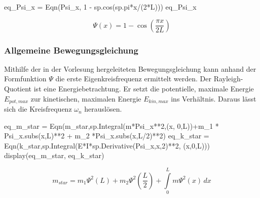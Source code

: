 \documentclass[
  letterpaper,
  DIV=11,
  numbers=noendperiod]{scrartcl}
\newenvironment{Shaded}{\begin{snugshade}}{\end{snugshade}}
\newcommand{\DecValTok}[1]{\textcolor[rgb]{0.68,0.00,0.00}{#1}}
\newcommand{\NormalTok}[1]{\textcolor[rgb]{0.00,0.23,0.31}{#1}}
\newcommand{\OperatorTok}[1]{\textcolor[rgb]{0.37,0.37,0.37}{#1}}
\begin{document}
\begin{Shaded}
\begin{Highlighting}[]
\NormalTok{eq\_Psi\_x }\OperatorTok{=}\NormalTok{ Eqn(Psi\_x, }\DecValTok{1} \OperatorTok{{-}}\NormalTok{ sp.cos(sp.pi}\OperatorTok{*}\NormalTok{x}\OperatorTok{/}\NormalTok{(}\DecValTok{2}\OperatorTok{*}\NormalTok{L)))}
\NormalTok{eq\_Psi\_x}
\end{Highlighting}
\end{Shaded}

\begin{equation}\Psi{\left(x \right)} = 1 - \cos{\left(\frac{\pi x}{2 L} \right)}\end{equation}

\hypertarget{allgemeine-bewegungsgleichung}{%
\subsubsection{Allgemeine
Bewegungsgleichung}\label{allgemeine-bewegungsgleichung}}

Mithilfe der in der Vorlesung hergeleiteten Bewegungsgleichung kann
anhand der Formfunktion \(\Psi\) die erste Eigenkreisfrequenz ermittelt
werden. Der Rayleigh-Quotient ist eine Energiebetrachtung. Er setzt die
potentielle, maximale Energie \(E_{pot,max}\) zur kinetischen, maximalen
Energie \(E_{kin,max}\) ins Verhältnis. Daraus lässt sich die
Kreisfrequenz \(\omega_n\) herauslösen.

\begin{Shaded}
\begin{Highlighting}[]
\NormalTok{eq\_m\_star }\OperatorTok{=}\NormalTok{ Eqn(m\_star,sp.Integral(m}\OperatorTok{*}\NormalTok{Psi\_x}\OperatorTok{**}\DecValTok{2}\NormalTok{,(x, }\DecValTok{0}\NormalTok{,L))}\OperatorTok{+}\NormalTok{m\_1 }\OperatorTok{*}\NormalTok{ Psi\_x.subs(x,L)}\OperatorTok{**}\DecValTok{2} \OperatorTok{+}\NormalTok{ m\_2 }\OperatorTok{*}\NormalTok{Psi\_x.subs(x,L}\OperatorTok{/}\DecValTok{2}\NormalTok{)}\OperatorTok{**}\DecValTok{2}\NormalTok{)}
\NormalTok{eq\_k\_star }\OperatorTok{=}\NormalTok{ Eqn(k\_star,sp.Integral(E}\OperatorTok{*}\NormalTok{I}\OperatorTok{*}\NormalTok{sp.Derivative(Psi\_x,x,}\DecValTok{2}\NormalTok{)}\OperatorTok{**}\DecValTok{2}\NormalTok{, (x,}\DecValTok{0}\NormalTok{,L)))}
\NormalTok{display(eq\_m\_star, eq\_k\_star)}
\end{Highlighting}
\end{Shaded}

\begin{equation}m_{star} = m_{1} \Psi^{2}{\left(L \right)} + m_{2} \Psi^{2}{\left(\frac{L}{2} \right)} + \int\limits_{0}^{L} m \Psi^{2}{\left(x \right)}\, dx\end{equation}
\end{document}
